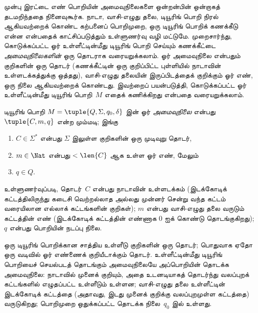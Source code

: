 \documentclass[../../../include/open-logic-section]{subfiles}
\begin{document}


\begin{explain}
முன்பு இரட்டை எண் பொறியின் அமைவுநிலைகளை ஒன்றன்பின் ஒன்றாகத்
தடமறிந்ததை நினைவுகூர்க. நாடா, வாசி-எழுது தலை, டியூரிங் பொறி நிரல்
ஆகியவற்றைக் கொண்ட கற்பனைப் பொறிமுறை, ஒரு டியூரிங் பொறிக் கணக்கீடு
என்ன என்பதைக் காட்சிப்படுத்தும் உள்ளுணர்வு வழி மட்டுமே. முறைசார்ந்து,
கொடுக்கப்பட்ட ஓர் உள்ளீட்டின்மீது டியூரிங் பொறி செய்யும் கணக்கீட்டை
\emph{அமைவுநிலைகளின்} ஒரு தொடராக வரையறுக்கலாம். ஓர் அமைவுநிலை
என்பதும் குறிகளின் ஒரு தொடர் (கணக்கீட்டின் ஒரு குறிப்பிட்ட புள்ளியில்
நாடாவின் உள்ளடக்கத்துக்கு ஒத்தது), வாசி-எழுது தலையின் இருப்பிடத்தைக்
குறிக்கும் ஓர் எண், ஒரு நிலை ஆகியவற்றைக் கொண்டது. இவற்றைப் பயன்படுத்தி,
கொடுக்கப்பட்ட ஓர் உள்ளீட்டின்மீது டியூரிங் பொறி~$M$ எதைக் கணிக்கிறது
என்பதை வரையறுக்கலாம்.
\end{explain}

\begin{defn}[அமைவுநிலை]
டியூரிங் பொறி $M = \tuple{Q, \Sigma, q_0, \delta}$ இன் ஓர்
\emph{அமைவுநிலை} என்பது $\tuple{C, m, q}$ என்ற மும்மடி; இங்கு
\begin{enumerate}
\item $C \in \Sigma^*$ என்பது $\Sigma$ இலுள்ள குறிகளின் ஒரு முடிவுறு தொடர்,
\item $m \in \Nat$ என்பது $< \len{C}$ ஆக உள்ள ஓர் எண், மேலும்
\item $q \in Q$.
\end{enumerate}
உள்ளுணர்வுப்படி, தொடர்~$C$ என்பது நாடாவின் உள்ளடக்கம் (இடக்கோடிக்
கட்டத்திலிருந்து கடைசி வெற்றல்லாத அல்லது முன்னர் சென்று வந்த கட்டம்
வரையிலான எல்லாக் கட்டங்களின் குறிகள்); $m$ என்பது வாசி-எழுது தலை
வருடும் கட்டத்தின் எண் (இடக்கோடிக் கட்டத்தின் எண்ணாக $0$ ஐக் கொண்டு
தொடங்குகிறது); $q$ என்பது பொறியின் நடப்பு நிலை.
\end{defn}

\begin{explain}
ஒரு டியூரிங் பொறிக்கான சாத்திய உள்ளீடு குறிகளின் ஒரு தொடர்; பொதுவாக
ஏதோ ஒரு வடிவில் ஓர் எண்ணைக் குறியீடாக்கும் தொடர். உள்ளீட்டின்மீது
டியூரிங் பொறியைச் செயல்படத் தொடங்கும் அமைவுநிலையே அப்பொறியின் தொடக்க
அமைவுநிலை: நாடாவில் முனைக் குறியும், அதை உடனடியாகத் தொடர்ந்து
வலப்புறக் கட்டங்களில் எழுதப்பட்ட உள்ளீடும் உள்ளன; வாசி-எழுது தலை
உள்ளீட்டின் இடக்கோடிக் கட்டத்தை (அதாவது, இடது முனைக் குறிக்கு
வலப்புறமுள்ள கட்டத்தை) வருடுகிறது; பொறிமுறை ஒதுக்கப்பட்ட தொடக்க
நிலை~$q_0$ இல் உள்ளது.
\end{explain}
\end{document}
